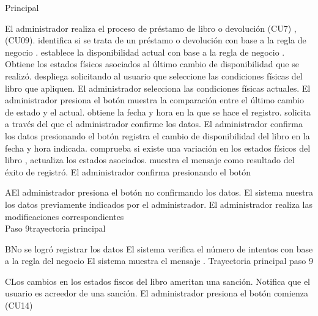	\begin{UCtrayectoria}{Principal}

	\UCpaso[\UCactor] El administrador realiza el proceso de préstamo de libro o devolución  \UCref(CU7) , \UCref(CU09).
	\UCpaso[\UCsist]   identifica si se trata de un préstamo o devolución con base a la regla de negocio .
 	\UCpaso[\UCsist]  establece la disponibilidad actual con base a la regla de negocio   .
	\UCpaso[\UCsist]  Obtiene los estados físicos asociados al último cambio de disponibilidad que se realizó.
	\UCpaso[\UCsist] despliega  solicitando al usuario que seleccione las  condiciones físicas del libro que apliquen.
	\UCpaso[\UCactor]El administrador selecciona las condiciones físicas actuales.
	\UCpaso[\UCactor] El administrador presiona el botón 
	\UCpaso[\UCsist]  muestra la comparación entre el último cambio de estado y el actual.
	\UCpaso[\UCsist] obtiene la fecha y hora en la que se hace el registro.
	\UCpaso[\UCsist] solicita a través del   que el administrador confirme los datos.
	\UCpaso[\UCactor] El administrador confirma los datos presionando el botón  
	\UCpaso[\UCsist] registra el cambio de disponibilidad del libro en la fecha y hora indicada.
	\UCpaso[\UCsist] comprueba si existe una variación en los estados físicos del libro , actualiza los estados asociados.
	\UCpaso[\UCsist] muestra el mensaje  como resultado del éxito de registró.
	\UCpaso[\UCactor] El administrador confirma presionando el botón  
			
	\end{UCtrayectoria}		
			
			
		\begin{UCtrayectoriaA}{A}{El administrador presiona el botón  no confirmando los datos.}
			\UCpaso[\UCsist] El sistema nuestra los datos previamente indicados por el administrador.
			\UCpaso[\UCactor] El administrador realiza las modificaciones correspondientes 
			\\ Paso 9trayectoria principal 
		\end{UCtrayectoriaA}
		\begin{UCtrayectoriaA}{B}{No se logró registrar los datos }
			\UCpaso[\UCsist] El sistema verifica el número de intentos con base a la regla del negocio 
			\UCpaso[\UCsist] El sistema muestra el mensaje .
			Trayectoria principal paso 9
		\end{UCtrayectoriaA}
		\begin{UCtrayectoriaA}{C}{Los cambios en los estados fiscos del libro ameritan una sanción. }
			\UCpaso[\UCsist] Notifica que el usuario es acreedor de una sanción.
			\UCpaso[\UCsist] El administrador presiona el botón 
			\UCpaso[\UCsist] comienza \UCref(CU14)
		\end{UCtrayectoriaA}
	


